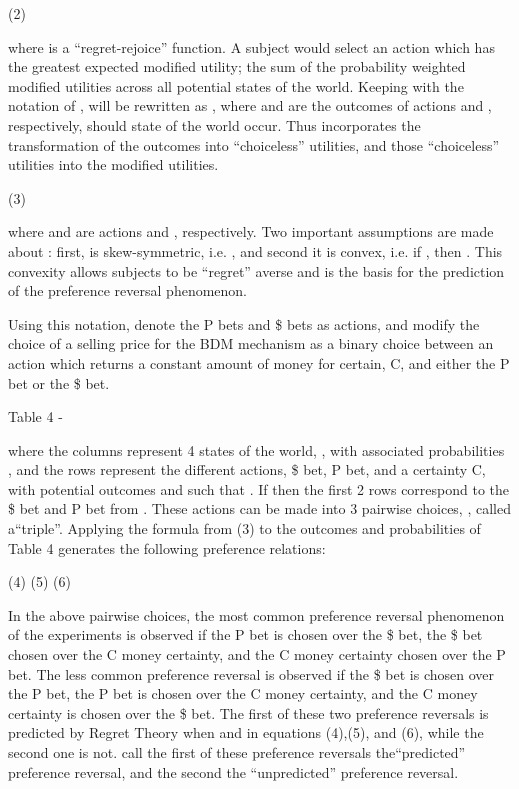 \documentclass[../main.tex]{subfiles}
\begin{document}
(2)	

where  is a \enquote{regret-rejoice} function. 
A subject would select an action which has the greatest expected modified utility; the sum of the probability weighted modified utilities across all potential states of the world.
Keeping with the notation of \textcite{Loomes1989}, will be rewritten as , where  and  are the outcomes of actions  and , respectively, should state of the world  occur.
Thus  incorporates the transformation of the outcomes into \enquote{choiceless} utilities, and those \enquote{choiceless} utilities into the modified utilities.


(3)	

where  and  are actions  and , respectively.
Two important assumptions are made about : first,  is skew-symmetric, i.e. , and second it is convex, i.e. if , then .
This convexity allows subjects to be \enquote{regret} averse and is the basis for the prediction of the preference reversal phenomenon.

Using this notation, \textcite{Loomes1989} denote the P bets and \$ bets as actions, and modify the choice of a selling price for the BDM mechanism as a binary choice between an action which returns a constant amount of money for certain, C, and either the P bet or the \$ bet.

Table 4 -  \textcite{Loomes1989}

where the columns represent 4 states of the world, , with associated probabilities , and the rows represent the different actions, \$ bet, P bet, and a certainty C, with potential outcomes  and  such that .
If  then the first 2 rows correspond to the \$ bet and P bet from \textcite{Grether1979}.
These actions can be made into 3 pairwise choices, , called a\enquote{triple}.
Applying the formula from (3) to the outcomes and probabilities of Table 4 generates the following preference relations:

(4)	
(5)	
(6)	

In the above pairwise choices, the most common preference reversal phenomenon of the \textcite{Grether1979} experiments is observed if the P bet is chosen over the \$ bet, the \$ bet chosen over the C money certainty, and the C money certainty chosen over the P bet.
The less common preference reversal is observed if the \$ bet is chosen over the P bet, the P bet is chosen over the C money certainty, and the C money certainty is chosen over the \$ bet.
The first of these two preference reversals is predicted by Regret Theory when  and  in equations (4),(5), and (6), while the second one is not.
\textcite[143]{Loomes1989} call the first of these preference reversals the\enquote{predicted} preference reversal, and the second the \enquote{unpredicted} preference reversal.
\end{document}
